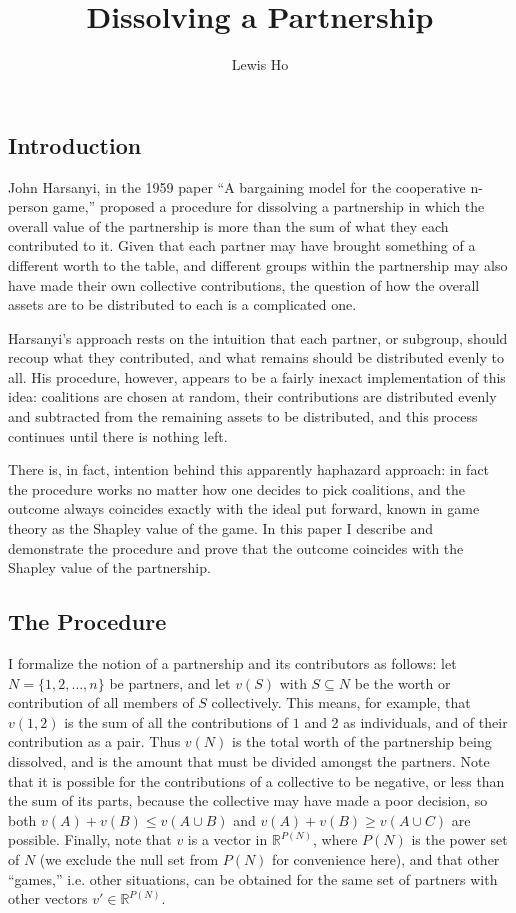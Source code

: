 \documentclass[12pt]{article}
\title{Dissolving a Partnership}
\author{Lewis Ho}
\begin{document}
\maketitle

\subsection*{Introduction}

John Harsanyi, in the 1959 paper ``A bargaining model for the cooperative n-person
game,'' proposed a procedure for dissolving a partnership in which the overall
value of the partnership is more than the sum of what they each contributed to it.
Given that each partner may have brought something of a different worth to the
table, and different groups within the partnership may also have made their own
collective contributions, the question of how the overall assets are to be
distributed to each is a complicated one.

Harsanyi's approach rests on the intuition that each partner, or subgroup,
should recoup what they contributed, and what remains should be distributed
evenly to all. His procedure, however, appears to be a fairly inexact
implementation of this idea: coalitions are chosen at random, their contributions
are distributed evenly and subtracted from the remaining assets to be distributed,
and this process continues until there is nothing left. 

There is, in fact, intention behind this apparently haphazard approach: in fact
the procedure works no matter how one decides to pick coalitions, and the outcome
always coincides exactly with the ideal put forward, known in game theory as
the Shapley value of the game.
In this paper I describe and demonstrate the procedure and prove
that the outcome coincides with the Shapley value of the partnership.

\subsection*{The Procedure}

I formalize the notion of a partnership and its contributors as follows: let
$N = \{1,2,\ldots, n\}$ be partners, and let $v(S)$ with $S \subseteq N$ be
the worth or contribution of all members of $S$ collectively. This means, for
example, that $v(1,2)$ is the sum of all the contributions of $1$ and 2 as
individuals, and of their contribution as a pair. Thus $v(N)$ is the total
worth of the partnership being dissolved, and is the amount that must be divided
amongst the partners.
Note that it is
possible for the contributions of a collective to be negative, or less than
the sum of its parts, because the collective may have made a poor decision,
so both $v(A) + v(B) \leq v(A\cup B)$ and $v(A) + v(B) \geq v(A\cup C)$ are
possible. Finally, note that $v$ is a vector in $\mathbb{R}^{P(N)}$, where
$P(N)$ is the power set of $N$ (we exclude the null set from $P(N)$ for
convenience here), and that other ``games,'' i.e. other situations, can be
obtained for the same set of partners with other vectors $v'\in \mathbb{R}^{P(N)}$.
\end{document}
